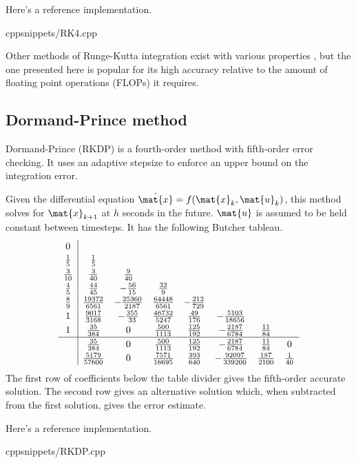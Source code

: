 Here's a reference implementation.
\begin{coderemote}{cpp}{snippets/RK4.cpp}
  \caption{RK4 implementation in C++}
\end{coderemote}

Other methods of Runge-Kutta integration exist with various properties
\cite{bib:wiki_rk4}, but the one presented here is popular for its high accuracy
relative to the amount of floating point operations (FLOPs) it requires.

\subsection{Dormand-Prince method}

Dormand-Prince (RKDP) is a fourth-order method with fifth-order error checking.
It uses an adaptive stepsize to enforce an upper bound on the integration error.
\begin{theorem}
  \label{thm:rkdp}

  Given the differential equation $\dot{\mat{x}} = f(\mat{x}_k, \mat{u}_k)$,
  this method solves for $\mat{x}_{k+1}$ at $h$ seconds in the future.
  $\mat{u}$ is assumed to be held constant between timesteps. It has the
  following Butcher tableau.
  \begin{equation*}
    \renewcommand\arraystretch{1.2}
    \begin{array}{c|ccccccc}
      0 \\
      \frac{1}{5} & \frac{1}{5} \\
      \frac{3}{10} & \frac{3}{40} & \frac{9}{40} \\
      \frac{4}{5} & \frac{44}{45} & -\frac{56}{15} & \frac{32}{9} \\
      \frac{8}{9} & \frac{19372}{6561} & -\frac{25360}{2187} &
        \frac{64448}{6561} & -\frac{212}{729} \\
      1 & \frac{9017}{3168} & -\frac{355}{33} & \frac{46732}{5247} &
        \frac{49}{176} & -\frac{5103}{18656} \\
      1 & \frac{35}{384} & 0 & \frac{500}{1113} & \frac{125}{192} &
        -\frac{2187}{6784} & \frac{11}{84} \\
      \hline
      & \frac{35}{384} & 0 & \frac{500}{1113} & \frac{125}{192} &
        -\frac{2187}{6784} & \frac{11}{84} & 0 \\
      & \frac{5179}{57600} & 0 & \frac{7571}{16695} & \frac{393}{640} &
        -\frac{92097}{339200} & \frac{187}{2100} & \frac{1}{40}
    \end{array}
  \end{equation*}
  The first row of coefficients below the table divider gives the fifth-order
  accurate solution. The second row gives an alternative solution which,
  when subtracted from the first solution, gives the error estimate.
\end{theorem}

Here's a reference implementation.
\begin{coderemote}{cpp}{snippets/RKDP.cpp}
  \caption{RKDP implementation in C++}
\end{coderemote}
